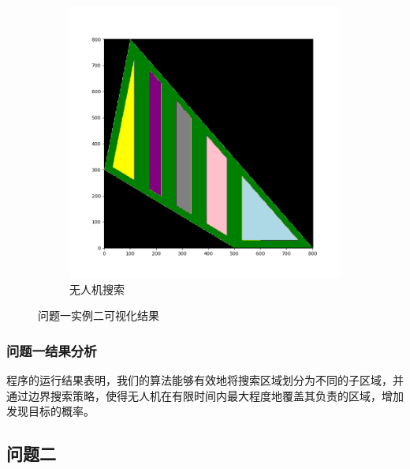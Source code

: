 \documentclass[bwprint]{gmcmthesis}
\numberwithin{figure}{section}
\begin{document}
\begin{enumerate}
\begin{figure}[h]
\begin{subfigure}{0.5\textwidth}
			\includegraphics[width=\textwidth]{../assets/img/4.png}  %
			\caption{无人机搜索}
		\end{subfigure}
		\caption{问题一实例二可视化结果}
	\end{figure}
\end{enumerate}

\subsubsection{问题一结果分析}

	程序的运行结果表明，我们的算法能够有效地将搜索区域划分为不同的子区域，并通过边界搜索策略，使得无人机在有限时间内最大程度地覆盖其负责的区域，增加发现目标的概率。


\subsection{问题二}
\end{document}
